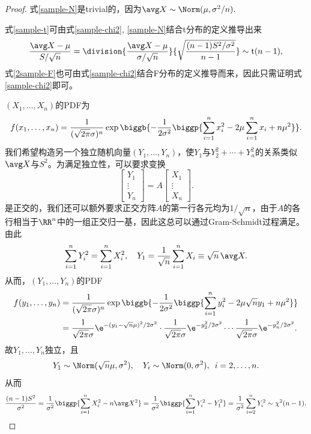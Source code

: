 \begin{proof}
	式\eqref{sample-N}是trivial的，因为$\avg X\sim\Norm(\mu,\sigma^2/n).$
	
	式\eqref{sample-t}可由式\eqref{sample-chi2}, \eqref{sample-N}结合t分布的定义推导出来
	\[
		\frac{\avg X-\mu}{S/\sqrt n}=\division{\frac{\avg X-\mu}{\sigma/\sqrt n}}{\sqrt{\frac{(n-1)S^2/\sigma^2}{n-1}}}\sim\mathrm t(n-1),
	\]
	式\eqref{2sample-F}也可由式\eqref{sample-chi2}结合F分布的定义推导而来，因此只需证明式\eqref{sample-chi2}即可。

	$(X_1,\ldots,X_n)$的PDF为
	\[
		f(x_1,\ldots,x_n)=\frac1{(\sqrt{2\pi}\sigma)^n}\exp\biggb{-\frac1{2\sigma^2}\biggp{\sum_{i=1}^nx_i^2-2\mu\sum_{i=1}^nx_i+n\mu^2}}.
	\]
	我们希望构造另一个独立随机向量$(Y_1,\ldots,Y_n)$，使$Y_1$与$Y_2^2+\cdots+Y_n^2$的关系类似$\avg X$与$S^2$。为满足独立性，可以要求变换
	\[
		\begin{bmatrix}
			Y_1\\\vdots\\Y_n
		\end{bmatrix}=A\begin{bmatrix}
			X_1\\\vdots\\X_n
		\end{bmatrix}.
	\]
	是正交的，我们还可以额外要求正交方阵$A$的第一行各元均为$1/\sqrt n$，由于$A$的各行相当于$\RR^n$中的一组正交归一基，因此这总可以通过Gram-Schmidt过程满足。
	由此
	\[
		\sum_{i=1}^nY_i^2=\sum_{i=1}^nX_i^2,\quad Y_1=\frac1{\sqrt n}\sum_{i=1}^nX_i\equiv\sqrt n\,\avg X.
	\]
	从而，$(Y_1,\ldots,Y_n)$的PDF
	\begin{align*}
		f(y_1,\ldots,y_n)&=\frac1{(\sqrt{2\pi}\sigma)^n}\exp\biggb{-\frac1{2\sigma^2}\biggp{\sum_{i=1}^ny_i^2-2\mu\sqrt ny_1+n\mu^2}}\\
		&=\frac1{\sqrt{2\pi}\sigma}\e^{-(y_1-\sqrt n\mu)^2/2\sigma^2}\cdot\frac1{\sqrt{2\pi}\sigma}\e^{-y_2^2/2\sigma^2}\cdots\frac1{\sqrt{2\pi}\sigma}\e^{-y_n^2/2\sigma^2}.
	\end{align*}
	故$Y_1,\ldots,Y_n$独立，且
	\[
		Y_1\sim\Norm(\sqrt n\mu,\sigma^2),\quad Y_i\sim\Norm(0,\sigma^2),\enspace i=2,\ldots,n.
	\]
	从而
	\[
		\frac{(n-1)S^2}{\sigma^2}
		=\frac1{\sigma^2}\biggp{\sum_{i=1}^nX_i^2-n\avg X^2}
		=\frac1{\sigma^2}\biggp{\sum_{i=1}^nY_i^2-Y_1^2}
		=\frac1{\sigma^2}\sum_{i=2}^nY_i^2\sim\chi^2(n-1).
		\qedhere
	\]
\end{proof}